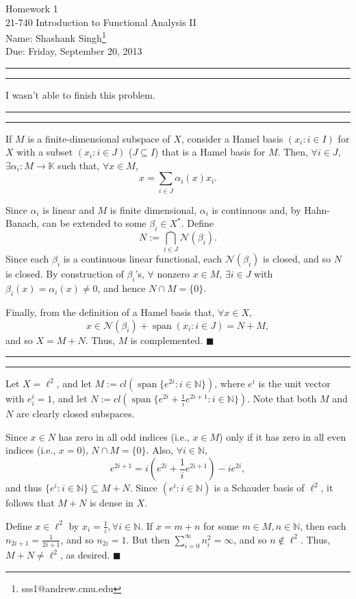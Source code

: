 \documentclass[11pt]{article}
\makeatletter
\newcounter{questionCounter}
\newcounter{partCounter}[questionCounter]
\newenvironment{question}[2][\arabic{questionCounter}]{%
    \setcounter{partCounter}{0}%
    \vspace{.25in} \hrule \vspace{0.5em}%
        \noindent{\bf #2}%
    \vspace{0.8em} \hrule \vspace{.10in}%
    \addtocounter{questionCounter}{1}%
}{}
\newcommand{\myname}{Shashank Singh\footnote{sss1@andrew.cmu.edu}}
\newcommand{\myclass}{21-740 Introduction to Functional Analysis II}
\newcommand{\myhwnum}{1}
\newcommand{\duedate}{Friday, September 20, 2013}
\renewcommand{\qed}{\quad \ensuremath{\blacksquare}}
\renewcommand{\sp}{\operatorname{span}} %
\newcommand{\N}{\mathbb{N}} %
\newcommand{\K}{\mathbb{K}} %
\newcommand{\Nul}{\mathcal{N}} %
\makeatother
\begin{document}
\thispagestyle{plain}

{\Large Homework \myhwnum} \\
\myclass \\
Name: \myname \\
Due: \duedate

\begin{question}{Problem 1}
I wasn't able to finish this problem.
\end{question}

\begin{question}{Problem 2}
If $M$ is a finite-dimensional subspace of $X$, consider a Hamel basis
$(x_i : i \in I)$ for $X$ with a subset $(x_i : i \in J)$ ($J \subseteq I$)
that is a Hamel basis for $M$. Then, $\forall i \in J$,
$\exists \alpha_i : M \to \K$ such that, $\forall x \in M$,
\[x = \sum_{i \in J} \alpha_i(x) x_i.\]

Since $\alpha_i$ is linear and $M$ is finite dimensional, $\alpha_i$ is
continuous and, by Hahn-Banach, can be extended to some $\beta_i \in X^*$.
Define \[N := \bigcap_{i \in J} \Nul(\beta_i).\]
Since each $\beta_i$ is a continuous linear functional, each $\Nul(\beta_i)$ is
closed, and so $N$ is closed. By construction of $\beta_i$'s,
$\forall$ nonzero $x \in M$, $\exists i \in J$ with
$\beta_i(x) = \alpha_i(x) \neq 0$, and hence $N \cap M = \{0\}$.

Finally, from the definition of a Hamel basis that, $\forall x \in X$,
\[x \in \Nul(\beta_i) + \sp(x_i : i \in J) = N + M,\]
and so $X = M + N$. Thus, $M$ is complemented. \qed
\end{question}

\newpage
\begin{question}{Problem 3}
Let $X = \ell^2$, and let $M := cl(\sp\{e^{2i} : i \in \N\})$, where $e^i$ is
the unit vector with $e^i_i = 1$, and let
$N := cl(\sp\{e^{2i} + \frac{1}{i}e^{2i + 1} : i \in \N\})$. Note that both $M$
and $N$ are clearly closed subspaces.

Since $x \in N$ has zero in all odd indices (i.e., $x \in M$) only if it has
zero in all even indices (i.e., $x = 0$), $N \cap M = \{0\}$. Also,
$\forall i \in \N$,
\[e^{2i + 1} = i\left(e^{2i} + \frac{1}{i}e^{2i + 1}\right) - ie^{2i},\]
and thus $\{e^i : i \in \N\} \subseteq M + N$. Since $(e^i : i \in \N)$ is a
Schauder basis of $\ell^2$, it follows that $M + N$ is dense in $X$.

Define $x \in \ell^2$ by $x_i = \frac{1}{i}, \forall i \in \N$. If $x = m + n$
for some $m \in M, n \in \N$, then each $n_{2i + 1} = \frac{1}{2i + 1}$, and so
$n_{2i} = 1$. But then $\sum_{i = 0}^\infty n_i^2 = \infty$, and so
$n \notin \ell^2$. Thus, $M + N \neq \ell^2$, as desired. \qed
\end{question}
\end{document}
